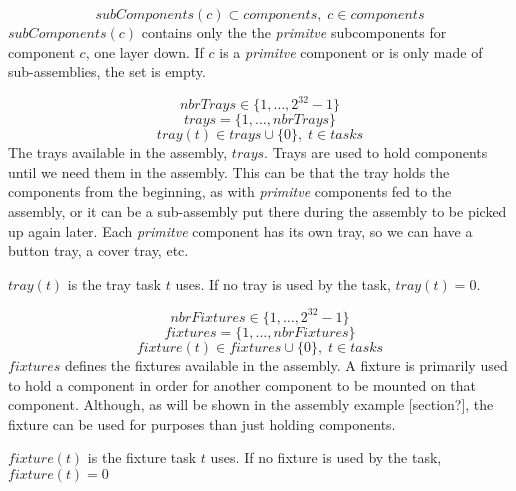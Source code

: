  \begin{equation}\label{eq:55}
 subComponents(c) \subset components, \; c \in components\end{equation}
 $subComponents(c)$ contains only the the \emph{primitve} subcomponents for component $c$, one layer down. If $c$ is a \emph{primitve} component or is only made of sub-assemblies, the set is empty.
 
 \begin{equation}\label{eq:4}
 nbrTrays \in \{1 , \ldots , 2^{32}-1\}
 \end{equation}
 \begin{equation}\label{eq:14}
 trays = \{1 , \ldots , nbrTrays\}
 \end{equation}
 \begin{equation}\label{eq:22}
 tray(t) \in trays \cup \{0\}, \; t \in tasks
 \end{equation}
 The trays available in the assembly, $trays$. Trays are used to hold components until we need them in the assembly. This can be that the tray holds the components from the beginning, as with \emph{primitve} components fed to the assembly, or it can be a sub-assembly put there during the assembly to be picked up again later. Each \emph{primitve} component has its own tray, so we can have a button tray, a cover tray, etc.
 
 $tray(t)$ is the tray task $t$ uses. If no tray is used by the task, $tray(t) = 0$.
 
 
 \begin{equation}\label{eq:5}
 nbrFixtures \in \{1 , \ldots , 2^{32}-1\}
 \end{equation}
 \begin{equation}\label{eq:15}
 fixtures = \{1 , \ldots , nbrFixtures\}
 \end{equation}
 \begin{equation}\label{eq:24}
 fixture(t) \in fixtures \cup \{0\}, \; t \in tasks
 \end{equation}
 $fixtures$ defines the fixtures available in the assembly. A fixture is primarily used to hold a component in order for another component to be mounted on that component. Although, as will be shown in the assembly example [section?], the fixture can be used for purposes than just holding components.
 
 $fixture(t)$ is the fixture task $t$ uses. If no fixture is used by the task, $fixture(t) = 0$
 
